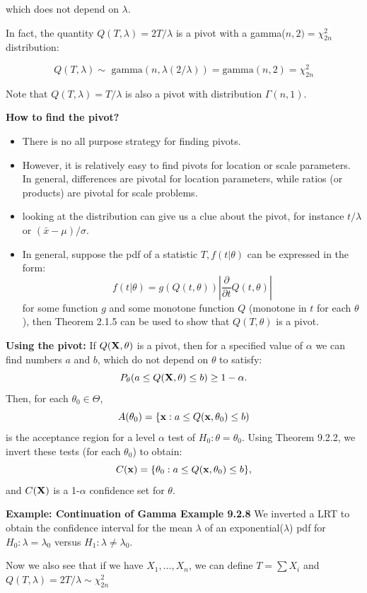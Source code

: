 \documentclass[11pt,]{article}
\newcommand{\Xndots}{X_1, \ldots, X_n}
\def\bx{{\bf x}}
\def\bX{{\bf X}}
\def\xbar{\bar{ x}}
\begin{document}
which does not depend on \(\lambda\).

In fact, the quantity \(Q(T,\lambda) = 2T/\lambda\) is a pivot with a
gamma(\(n,2) = \chi^2_{2n}\) distribution:

\[Q(T,\lambda) \sim \mbox{ gamma}(n,\lambda(2/\lambda)) = \mbox{gamma}(n,2) = \chi^2_{2n}\]

Note that \(Q(T, \lambda) = T/\lambda\) is also a pivot with
distribution \(\Gamma(n,1)\).

\noindent\textbf{How to find the pivot?}

\begin{itemize}
\item There is no all purpose strategy for finding pivots.
\item  However, it is relatively easy to find pivots for location or scale parameters. In general, differences are pivotal for location parameters, while ratios (or products) are pivotal for scale problems.
\item looking at the distribution can give us a clue about the pivot, for instance $t/\lambda$ or $(\xbar - \mu)/\sigma$.
\item In general, suppose the pdf of a statistic $T, f(t|\theta)$ can be expressed in the form:
$$f(t| \theta) = g(Q(t,\theta))\left| \frac{\partial}{\partial t} Q(t, \theta)\right|$$
for some function $g$ and some monotone function $Q$ (monotone in $t$ for each $\theta$), then Theorem 2.1.5 can be used to show that $Q(T,\theta)$ is a pivot.
\end{itemize}

\noindent\textbf{Using the pivot:} If \(Q(\bX, \theta)\) is a pivot,
then for a specified value of \(\alpha\) we can find numbers \(a\) and
\(b\), which do not depend on \(\theta\) to satisfy:
\[P_\theta (a \leq Q(\bX, \theta) \leq b) \geq 1- \alpha.\] Then, for
each \(\theta_0 \in \Theta\),
\[ A(\theta_0) = \{\bx: a \leq Q(\bx, \theta_0) \leq b)\] is the
acceptance region for a level \(\alpha\) test of
\(H_0: \theta = \theta_0\). Using Theorem 9.2.2, we invert these tests
(for each \(\theta_0\)) to obtain:
\[C(\bx) = \{ \theta_0: a \leq Q(\bx, \theta_0) \leq b\},\] and
\(C(\bX)\) is a 1-\(\alpha\) confidence set for \(\theta\).

\noindent\textbf{Example: Continuation of Gamma Example 9.2.8} We
inverted a LRT to obtain the confidence interval for the mean
\(\lambda\) of an exponential(\(\lambda\)) pdf for
\(H_0: \lambda = \lambda_0\) versus \(H_1:\lambda \neq \lambda_0\).

Now we also see that if we have \(\Xndots\), we can define
\(T = \sum X_i\) and \(Q(T,\lambda) = 2T/\lambda \sim \chi^2_{2n}\)
\end{document}
